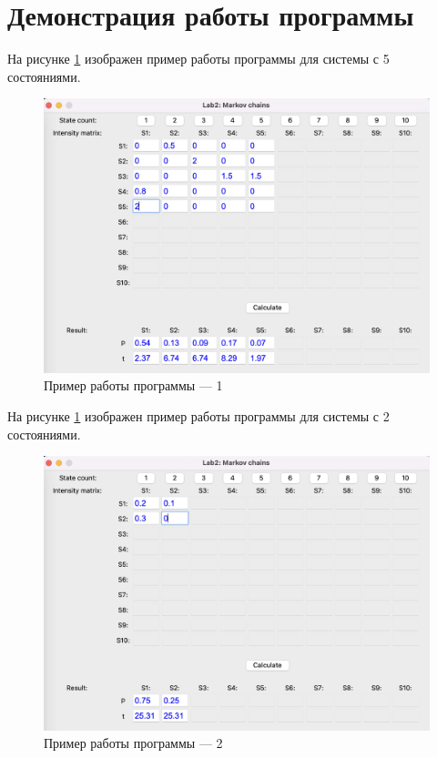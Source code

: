 \documentclass[12pt]{report}
\begin{document}
\section*{Демонстрация работы программы}
На рисунке \ref{fig:pic1} изображен пример работы программы для системы с 5 состояниями.

\begin{figure}[h!btp]
	\centering
	\includegraphics[width=1\textwidth]{inc/pic1.png}
	\caption{Пример работы программы --- 1}
	\label{fig:pic1}	
\end{figure}

\clearpage
На рисунке \ref{fig:pic1} изображен пример работы программы для системы с 2 состояниями.

\begin{figure}[h!btp]
	\centering
	\includegraphics[width=1\textwidth]{inc/pic2.png}
	\caption{Пример работы программы --- 2}
	\label{fig:pic2}	
\end{figure}
\clearpage
\end{document}
